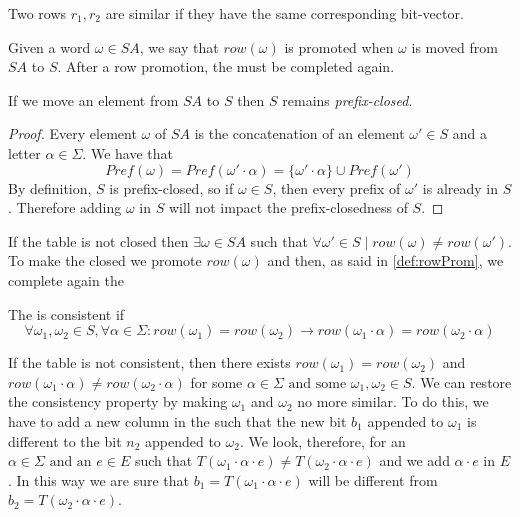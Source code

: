 \begin{definition} Two rows $r_1, r_2$ are similar if they have the same corresponding bit-vector.
\end{definition}

\begin{definition}
  \label{def:rowProm}
  Given a word $\omega \in SA$, we say that $row(\omega)$ is promoted when $\omega$ is moved from $SA$ to $S$. After a row promotion, the \OT must be completed again.
\end{definition}

\begin{lemma}
  \label{lemmaPromoteLinePrefixClosedness}
  If we move an element from $SA$ to $S$ then $S$ remains \textit{prefix-closed}.
\end{lemma}

\begin{proof}
  Every element $\omega$ of $SA$ is the concatenation of an element $\omega' \in S$ and a letter $\alpha \in \Sigma$. We have that
  \[Pref(\omega) = Pref(\omega' \cdot \alpha) = \{\omega' \cdot \alpha\} \cup Pref(\omega')\]
  By definition, $S$ is prefix-closed, so if $\omega \in S$, then every prefix of $\omega'$ is already in $S$. Therefore adding $\omega$ in $S$ will not impact the prefix-closedness of $S$.
\end{proof}

If the table is not closed then $\exists \omega \in SA$ such that $\forall \omega' \in S \mid row(\omega) \neq row(\omega')$. To make the \OT closed we promote $row(\omega)$ and then, as said in \cref{def:rowProm}, we complete again the \OT

\begin{definition}[Consistency]
  The \OT is consistent if
  \[\forall \omega_1,\omega_2 \in S, \forall \alpha \in \Sigma:  row(\omega_1) = row(\omega_2) \rightarrow row(\omega_1 \cdot \alpha) = row(\omega_2 \cdot \alpha)\]
\end{definition}

If the table is not consistent, then there exists $row(\omega_1) = row(\omega_2)$ and $row(\omega_1 \cdot \alpha) \neq row(\omega_2 \cdot \alpha)$ for some $\alpha \in \Sigma \text{ and some }\omega_1, \omega_2 \in S$. We can restore the consistency property by making $\omega_1$ and $\omega_2$ no more similar. To do this, we have to add a new column in the \OT such that the new bit $b_1$ appended to $\omega_1$ is different to the bit $n_2$ appended to $\omega_2$. We look, therefore, for an $\alpha \in \Sigma \text{ and an } e \in E$ such that $T(\omega_1 \cdot \alpha \cdot e) \neq T(\omega_2 \cdot \alpha \cdot e)$ and we add $\alpha \cdot e$ in $E$. In this way we are sure that $b_1 = T(\omega_1 \cdot \alpha \cdot e)$ will be different from $b_2 = T(\omega_2 \cdot \alpha \cdot e)$.

